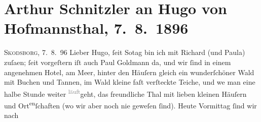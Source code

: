 

         
         \newcommand{\erwaehntePersonen}{Personen:  ?? [Frau des Leuchtturmwärters],  ?? [Leuchtturmwärter],  ?? [Teenagertochter eines Leuchtturmwärters], Richard Beer-Hofmann, Paula Beer-Hofmann, Paul Goldmann, Hugo von Hofmannsthal, Henrik Ibsen, Peter Nansen}
         \newcommand{\erwaehnteOrte}{Orte: Badehotel, Berlin, Göteborg, Kopenhagen, Nordkap, Oslo, Ostsee, Skodsborg, Trondheim, Ven, Wien}
         \newcommand{\erwaehnteWerke}{Werke: Freiwild. Schauspiel in 3 Akten, Geschichte der beiden Liebespaare}
               \section[Arthur Schnitzler an Hugo von Hofmannsthal, 7. 8. 1896]{ Arthur Schnitzler an Hugo von Hofmannsthal, 7. 8. 1896}\nopagebreak{}\rehead{ }\begin{ledgroupsized}[t]{13cm}\normalsize\beginnumbering \toendnotes[C]{\smallbreak\pagebreak[2]} 
\toendnotes[C]{\smallbreak}\pstart
           \raggedleft{}{\pb}\textsc{Skodsborg},
                            7. 8. 96\pend
           \pstart
           Lieber Hugo, ſeit So{\geminationn}tag bin ich mit Richard (und
                        Paula) zuſa{\geminationm}en; ſeit vorgeſtern iſt auch Paul Goldmann
                    da, und wir ſind in einem angenehmen Hotel, am Meer, hinter den Häuſern gleich
                    ein wunderſchöner Wald mit Buchen und Tannen, im Wald kleine faſt verſteckte
                    Teiche, und we{\geminationn} man eine halbe Stunde weiter \substVorne{}\textsuperscript{\textcolor{gray}{läuft}}\substDazwischen{}geht\substHinten{}, das freundliche Thal mit lieben kleinen Häuſern und Ort\substVorne{}\textsuperscript{en}\substDazwischen{}ſchaften\substHinten{} (wo wir aber noch nie geweſen ſind). Heute Vormittag ſind wir nach

\end{ledgroupsized}
